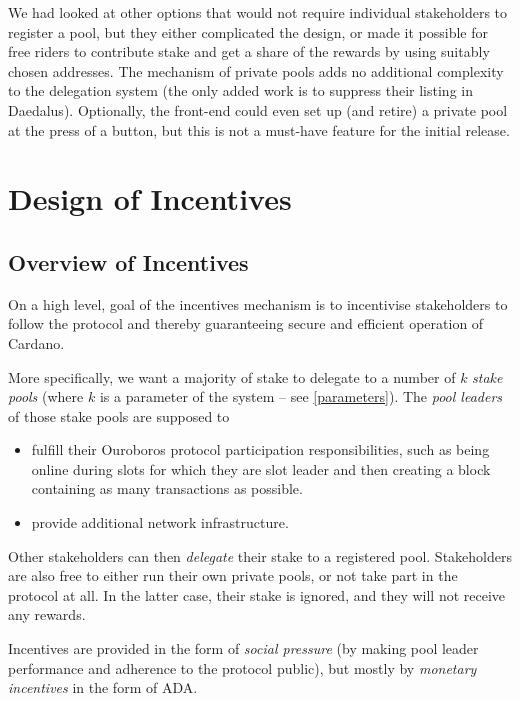 \documentclass[11pt,a4paper]{article}
\begin{document}
We had looked at other options that would not require individual
stakeholders to register a pool, but they either complicated the
design, or made it possible for free riders to contribute stake and
get a share of the rewards by using suitably chosen addresses. The
mechanism of private pools adds no additional complexity to the
delegation system (the only added work is to suppress their listing in
Daedalus). Optionally, the front-end could even set up (and retire) a
private pool at the press of a button, but this is not a must-have
feature for the initial release.

\section{Design of Incentives}
\label{design-of-incentives}

\subsection{Overview of Incentives}
\label{overview-of-incentives}

On a high level, goal of the incentives mechanism is to incentivise
stakeholders to follow the protocol and thereby guaranteeing secure and
efficient operation of Cardano.

More specifically, we want a majority of stake to
delegate to a number of \(k\) \emph{stake pools} (where \(k\) is a
parameter of the system -- see \cref{parameters}). The
\emph{pool leaders} of those stake pools are supposed to

\begin{itemize}
\item
  fulfill their Ouroboros protocol participation responsibilities,
  such as being online during slots for which they are slot leader and
  then creating a block containing as many transactions as possible.
\item
  provide additional network infrastructure.
\end{itemize}

Other stakeholders can then \emph{delegate} their stake to a registered
pool.  Stakeholders are also free to either run their own private
pools, or not take part in the protocol at all. In the latter case,
their stake is ignored, and they will not receive any rewards.

Incentives are provided in the form of \emph{social pressure} (by making
pool leader performance and adherence to the protocol public), but
mostly by \emph{monetary incentives} in the form of ADA.
\end{document}

